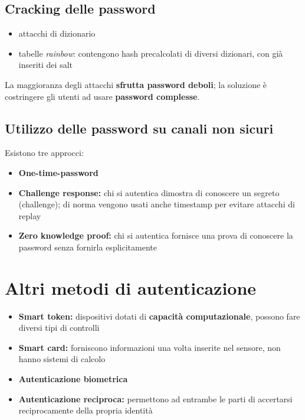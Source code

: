 \subsection{Cracking delle password}
\begin{itemize}
    \item attacchi di dizionario 
    \item tabelle \textit{rainbow}: contengono hash precalcolati di diversi dizionari, con già inseriti 
    dei salt 
\end{itemize}

\noindent La maggioranza degli attacchi \textbf{sfrutta password deboli}; la soluzione è costringere 
gli utenti ad usare \textbf{password complesse}.

\subsection{Utilizzo delle password su canali non sicuri}
Esistono tre approcci:
\begin{itemize}
    \item \textbf{One-time-password}
    \item \textbf{Challenge response:} chi si autentica dimostra di conoscere un segreto (challenge); 
    di norma vengono usati anche timestamp per evitare attacchi di replay
    \item \textbf{Zero knowledge proof:} chi si autentica fornisce una prova di conoscere la password 
    senza fornirla esplicitamente 
\end{itemize}

\section{Altri metodi di autenticazione}
\begin{itemize}
    \item \textbf{Smart token:} dispositivi dotati di \textbf{capacità computazionale}, possono fare diversi tipi di controlli 
    \item \textbf{Smart card:} forniscono informazioni una volta inserite nel sensore, non hanno sistemi di calcolo 
    \item \textbf{Autenticazione biometrica}
    \item \textbf{Autenticazione reciproca:} permettono ad entrambe le parti di accertarsi reciprocamente della propria identità
\end{itemize}

\newpage
